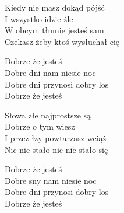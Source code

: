 \begin{text}
    Kiedy nie masz dokąd pójść\\
    I wszystko idzie źle\\
    W obcym tłumie jesteś sam\\
    Czekasz żeby ktoś wysłuchał cię

    Dobrze że jesteś\\
    Dobre dni nam niesie noc\\
    Dobre dni przynosi dobry los\\
    Dobrze że jesteś

    Słowa złe najprostsze są\\
    Dobrze o tym wiesz\\
    I przez łzy powtarzasz wciąż\\
    Nic nie stało nic nie stało się

    Dobrze że jesteś\\
    Dobre sny nam niesie noc\\
    Dobre dni przynosi dobry los\\
    Dobrze że jesteś
\end{text}
\begin{chord}

\end{chord}